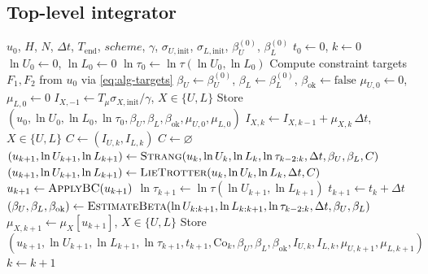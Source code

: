 \documentclass{article}
\begin{document}
\subsection{Top-level integrator}\label{ssec:alg-top-level}
\begin{algorithm}[H]
\caption{Top-level integrator}
\begin{algorithmic}[1]
\Require $u_0$, $H$, $N$, $\Delta t$, $T_{\mathrm{end}}$, $\mathit{scheme}$, $\gamma$, $\sigma_{U,\mathrm{init}}$, $\sigma_{L,\mathrm{init}}$, $\beta_U^{(0)}$, $\beta_L^{(0)}$
\State $t_0 \gets 0$, $k \gets 0$
\State $\ln U_0 \gets 0$, $\ln L_0 \gets 0$
\State $\ln \tau_0 \gets \ln \tau(\ln U_0, \ln L_0)$ \Comment{\eqref{eq:1d-ln-clock}, \eqref{eq:ns-ln-clock}}
\State Compute constraint targets $F_1, F_2$ from $u_0$ via \eqref{eq:alg-targets}
\State $\beta_U \gets \beta_U^{(0)}$, $\beta_L \gets \beta_L^{(0)}$, $\beta_{\mathrm{ok}} \gets \text{false}$
\State $\mu_{U,0} \gets 0$, $\mu_{L,0} \gets 0$ \Comment{\eqref{eq:ns-sr-miss-def}}
\State $I_{X,-1} \gets T_\mu \sigma_{X,\mathrm{init}}/\gamma$, $X \in \{U, L\}$ 
\State Store $(u_0, \ln U_0, \ln L_0, \ln \tau_0, \beta_U, \beta_L, \beta_{\mathrm{ok}}, \mu_{U,0}, \mu_{L,0})$
  \If{$\gamma \neq \varnothing$}
    \State $I_{X,k} \gets I_{X,k-1} + \mu_{X,k}\, \Delta t$, $X \in \{U, L\}$ \Comment{\eqref{eq:ns-sr-integral}}
    \State $C \gets (I_{U,k}, I_{L,k})$ \Comment{\S\ref{ssec:ns-scale-relaxation}}
  \Else
    \State $C \gets \varnothing$
  \EndIf
    \State $(u_{k+1}, \ln U_{k+1}, \ln L_{k+1}) \gets \Call{Strang}{u_k, \ln U_k, \ln L_k, \ln \tau_{k-2:k}, \Delta t, \beta_U, \beta_L, C}$ \Comment{\S\ref{ssec:alg-strang}}
  \Else
    \State $(u_{k+1}, \ln U_{k+1}, \ln L_{k+1}) \gets \Call{LieTrotter}{u_k, \ln U_k, \ln L_k, \Delta t, C}$ \Comment{\S\ref{ssec:alg-lie-trotter}}
  \EndIf
  \State $u_{k+1} \gets \Call{ApplyBC}{u_{k+1}}$ 
  \State $\ln \tau_{k+1} \gets \ln \tau(\ln U_{k+1}, \ln L_{k+1})$ \Comment{\eqref{eq:1d-ln-clock}, \eqref{eq:ns-ln-clock}}
  \State $t_{k+1} \gets t_k + \Delta t$
    \State $(\beta_U, \beta_L, \beta_{\mathrm{ok}}) \gets \Call{EstimateBeta}{\ln U_{k:k+1}, \ln L_{k:k+1}, \ln \tau_{k-2:k}, \Delta t, \beta_U, \beta_L}$ \Comment{\S\ref{ssec:alg-beta-estimation}}
  \EndIf
  \State $\mu_{X,k+1} \gets \mu_X[u_{k+1}]$, $X \in \{U, L\}$ \Comment{\eqref{eq:ns-sr-miss-def}}
  \State Store $(u_{k+1}, \ln U_{k+1}, \ln L_{k+1}, \ln \tau_{k+1}, t_{k+1}, \mathrm{Co}_k, \beta_U, \beta_L, \beta_{\mathrm{ok}}, I_{U,k}, I_{L,k}, \mu_{U,k+1}, \mu_{L,k+1})$ \Comment{\eqref{eq:alg-realized-cfl}}
  \State $k \gets k + 1$
\EndWhile
\end{algorithmic}
\end{algorithm}
\end{document}
